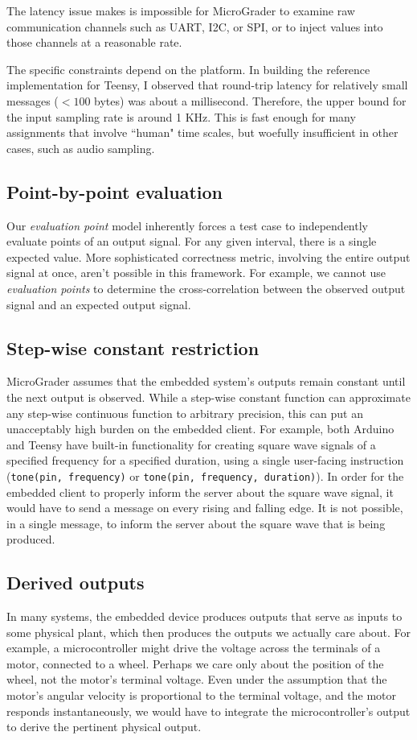 \documentclass[12pt]{article}
\begin{document}
The latency issue makes is impossible for MicroGrader to examine raw communication channels such as UART, I2C, or SPI, or to inject values into those channels at a reasonable rate.

The specific constraints depend on the platform.  In building the reference implementation for Teensy, I observed that round-trip latency for relatively small messages ($<100$ bytes) was about a millisecond.  Therefore, the upper bound for the input sampling rate is around 1 KHz.  This is fast enough for many assignments that involve ``human" time scales, but woefully insufficient in other cases, such as audio sampling.

\subsection{Point-by-point evaluation}
Our \textit{evaluation point} model inherently forces a test case to independently evaluate points of an output signal.  For any given interval, there is a single expected value.   More sophisticated correctness metric, involving the entire output signal at once, aren't possible in this framework.  For example, we cannot use \textit{evaluation points} to determine the cross-correlation between the observed output signal and an expected output signal.

\subsection{Step-wise constant restriction}
MicroGrader assumes that the embedded system's outputs remain constant until the next output is observed.  While a step-wise constant function can approximate any step-wise continuous function to arbitrary precision, this can put an unacceptably high burden on the embedded client.  For example, both Arduino and Teensy have built-in functionality for creating square wave signals of a specified frequency for a specified duration, using a single user-facing instruction (\texttt{tone(pin, frequency)} or \texttt{tone(pin, frequency, duration)}).  In order for the embedded client to properly inform the server about the square wave signal, it would have to send a message on every rising and falling edge.  It is not possible, in a single message, to inform the server about the square wave that is being produced.

\subsection{Derived outputs}
\label{sec:derived-outputs}
In many systems, the embedded device produces outputs that serve as inputs to some physical plant, which then produces the outputs we actually care about.  For example, a microcontroller might drive the voltage across the terminals of a motor, connected to a wheel.  Perhaps we care only about the position of the wheel, not the motor's terminal voltage.  Even under the assumption that the motor's angular velocity is proportional to the terminal voltage, and the motor responds instantaneously, we would have to integrate the microcontroller's output to derive the pertinent physical output.
\end{document}
